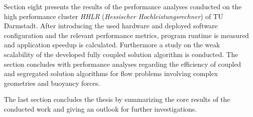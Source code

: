 Section eight presents the results of the performance analyses conducted on the high performance cluster \emph{HHLR} (\emph{Hessischer Hochleistungsrechner}) of TU Darmstadt. After introducing the used hardware and deployed software configuration and the relevant performance metrics, program runtime is measured and application speedup is calculated. Furthermore a study on the weak scalability of the developed fully coupled solution algorithm is conducted. The section concludes with performance analyses regarding the efficiency of coupled and segregated solution algorithms for flow problems involving complex geometries and buoyancy forces.

The last section concludes the thesis by summarizing the core results of the conducted work and giving an outlook for further investigations.

